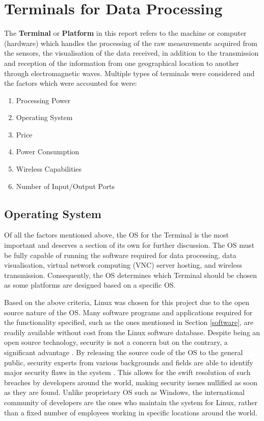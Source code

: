 \chapter{Terminals for Data Processing} 
\label{terminals}

The {\bf Terminal} or {\bf Platform} in this report refers to the machine or computer (hardware) which handles the processing of the raw measurements acquired from the sensors, the visualisation of the data received, in addition to the transmission and reception of the information from one geographical location to another through electromagnetic waves. Multiple types of terminals were considered and the factors which were accounted for were:

\begin{enumerate}
	\item Processing Power
	\item Operating System
	\item Price
	\item Power Consumption
	\item Wireless Capabilities
	\item Number of Input/Output Ports
\end{enumerate} 

\section{Operating System}
\label{os}

Of all the factors mentioned above, the OS for the Terminal is the most important and deserves a section of its own for further discussion. The OS must be fully capable of running the software required for data processing, data visualisation, virtual network computing (VNC) server hosting, and wireless transmission. Consequently, the OS determines which Terminal should be chosen as some platforms are designed based on a specific OS.  

Based on the above criteria, Linux was chosen for this project due to the open source nature of the OS. Many software programs and applications required for the functionality specified, such as the ones mentioned in Section \ref{software}, are readily available without cost from the Linux software database. Despite being an open source technology, security is not a concern but on the contrary, a significant advantage \cite{linuxadvantagedisadvantage}. By releasing the source code of the OS to the general public, security experts from various backgrounds and fields are able to identify major security flaws in the system \cite{linuxadvantagedisadvantage}. This allows for the swift resolution of such breaches by developers around the world, making security issues nullified as soon as they are found. Unlike proprietary OS such as Windows, the international community of developers are the ones who maintain the system for Linux, rather than a fixed number of employees working in specific locations around the world.  

